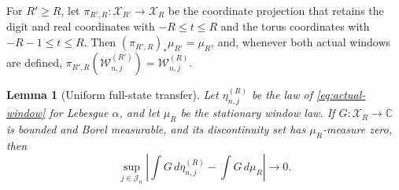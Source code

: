 \documentclass[11pt,a4paper]{amsart}
\newtheorem{lemma}[theorem]{Lemma}
\theoremstyle{definition}
\theoremstyle{remark}
\begin{document}
For $R'\ge R$, let
$\pi_{R',R}:\mathcal X_{R'}\to\mathcal X_R$ be the coordinate projection
that retains the digit and real coordinates with $-R\le t\le R$ and the
torus coordinates with $-R-1\le t\le R$.  Then
$(\pi_{R',R})_*\mu_{R'}=\mu_R$, and, whenever both actual windows are
defined,
$\pi_{R',R}(\mathcal W_{n,j}^{(R')})=\mathcal W_{n,j}^{(R)}$.

\begin{lemma}[Uniform full-state transfer]\label{lem:full-state}
Let $\eta_{n,j}^{(R)}$ be the law of \eqref{eq:actual-window} for Lebesgue
$\alpha$, and let $\mu_R$ be the stationary window law.  If
$G:\mathcal X_R\to\mathbb C$ is bounded and Borel measurable, and its
discontinuity set has
$\mu_R$-measure zero, then
\begin{equation}\label{eq:full-state}
 \sup_{j\in\mathcal J_n}
 \left|\int G\,d\eta_{n,j}^{(R)}-\int G\,d\mu_R\right|\longrightarrow0.
\end{equation}
\end{lemma}
\end{document}
